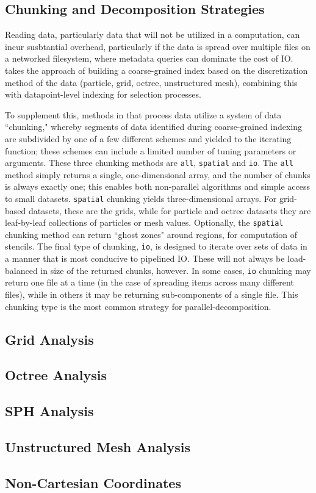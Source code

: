 \subsection{Chunking and Decomposition Strategies}


Reading data, particularly data that will not be utilized in a computation, can
incur susbtantial overhead, particularly if the data is spread over multiple
files on a networked filesystem, where metadata queries can dominate the cost
of IO.  \yt{} takes the approach of building a coarse-grained index based on
the discretization method of the data (particle, grid, octree, unstructured
mesh), combining this with datapoint-level indexing for selection processes.

To supplement this, methods in \yt{} that process data utilize a system of data
``chunking," whereby segments of data identified during coarse-grained indexing
are subdivided by one of a few different schemes and yielded to the iterating
function; these schemes can include a limited number of tuning parameters or
arguments.  These three chunking methods are \texttt{all}, \texttt{spatial} and
\texttt{io}.  The \texttt{all} method simply returns a single, one-dimensional
array, and the number of chunks is always exactly one; this enables both
non-parallel algorithms and simple access to small datasets.  \texttt{spatial}
chunking yields three-dimensional arrays.  For grid-based datasets,
these are the grids, while for particle and octree datasets they are
leaf-by-leaf collections of particles or mesh values.  Optionally, the
\texttt{spatial} chunking method can return ``ghost zones" around regions, for
computation of stencils.  The final type of chunking, \texttt{io}, is designed
to iterate over sets of data in a manner that is most conducive to pipelined
IO.  These will not always be load-balanced in size of the returned chunks,
however.  In some cases, \texttt{io} chunking may return one file at a time (in
the case of spreading items across many different files), while in others it
may be returning sub-components of a single file.  This chunking type is the
most common strategy for parallel-decomposition.

\subsection{Grid Analysis}

\subsection{Octree Analysis}

\subsection{SPH Analysis}

\subsection{Unstructured Mesh Analysis}

\subsection{Non-Cartesian Coordinates}



